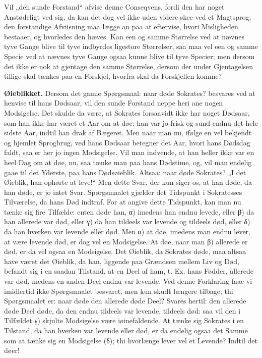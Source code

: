 \documentclass[12pt,a4paper]{book}
\begin{document}
Vil „den sunde Forstand“ afvise denne Conseqvens, fordi den har noget
Anstødeligt ved sig, da kan det dog vel ikke uden videre skee ved et
Magtsprog; den forstandige Afviisning maa lægge an paa at eftervise,
hvori Misligheden bestaaer, og hvorledes den hæves. Kan een og samme
Størrelse ved at nævnes tyve Gange blive til tyve indbyrdes ligestore
Størrelser, saa maa vel een og samme Specie ved at nævnes tyve Gange
ogsaa kunne blive til tyve Specier; men dersom det ikke er nok at
gjentage den samme Størrelse, dersom der under Gjentagelsen tillige
skal tænkes paa en Forskjel, hvorfra skal da Forskjellen komme?

\textbf{Øieblikket.} Dersom det gamle Spørgsmaal: naar døde Sokrates?
besvares ved at henvise til hans Dødsaar, vil den sunde Forstand neppe
heri ane nogen Modsigelse. Det skulde da være, at Sokrates forsaavidt
ikke har noget Dødsaar, som han ikke har været et Aar om at døe: han
var jo frisk og sund endnu det hele sidste Aar, indtil han drak af
Bægeret. Men naar man nu, ifølge en vel bekjendt og hjemlet
Sprogbrug, ved hans Dødsaar betegner det Aar, hvori hans
Dødsdag faldt, saa er her jo ingen Modsigelse. Vil man indvende, at
han heller ikke var en heel Dag om at døe, nu, saa tænke man paa hans
Dødstime, og, vil man endelig gaae til det Yderste, paa hans
Dødsøieblik. Altsaa: naar døde Sokrates? „I det Øieblik, han ophørte
at leve!“ Men dette Svar, der kun siger os, at han døde, da han døde,
er jo intet Svar. Spørgsmaalet gjælder det Tidspunkt i Sokratesses
Tilværelse, da hans Død indtraf. For at angive dette Tidspunkt, kan
man nu tænke sig fire Tilfælde: enten døde han, α) imedens han endnu
levede, eller β) da han allerede var død, eller γ) da han tildeels var
levende og tildeels død, eller δ) da han hverken var levende eller
død. Men α) at døe, imedens man endnu lever, at være levende død, er
dog vel en Modsigelse. At døe, naar man β) allerede er død, er da vel
ogsaa en Modsigelse. Det Øieblik, da Sokrates døde, maa altsaa have
været det Øieblik, da han, liggende paa Grændsen mellem Liv og Død,
befandt sig i en saadan Tilstand, at en Deel af ham, t. Ex. hans
Fødder, allerede var død, medens en anden Deel endnu var levende. Ved
denne Forklaring faae vi imidlertid ikke Spørgsmaalet besvaret, men
kun skudt længere tilbage; thi Spørgsmaalet er: naar døde den allerede
døde Deel? Svares hertil: den allerede døde Deel døde, da den endnu
tildeels var levende, tildeels død: saa vil den i Tilfældet γ) skjulte
Modsigelse være iøinefaldende. At tænke sig Sokrates i en Tilstand,
da han hverken var levende eller død, er da endelig ogsaa det Samme
som at tænke sig en Modsigelse (δ); thi hvorlænge lever vel et
Levende? Indtil det døer!
\end{document}
